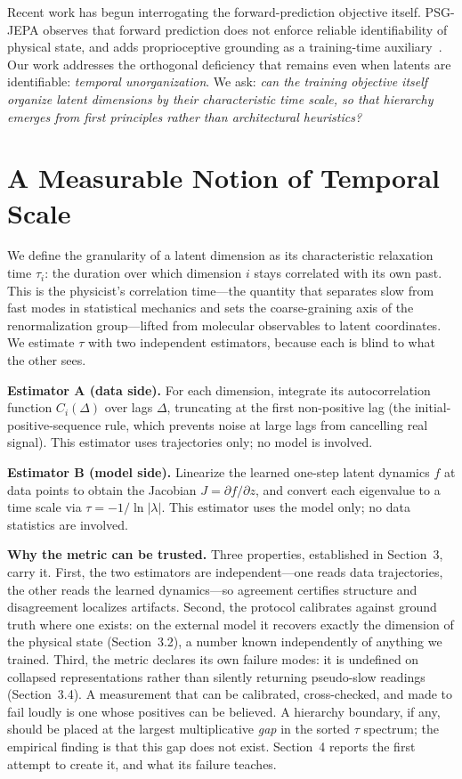 \documentclass[11pt]{article}
\begin{document}
Recent work has begun interrogating the forward-prediction objective itself. PSG-JEPA observes that forward prediction does not enforce reliable identifiability of physical state, and adds proprioceptive grounding as a training-time auxiliary~\cite{psgjepa2026}. Our work addresses the orthogonal deficiency that remains even when latents are identifiable: \emph{temporal unorganization}. We ask: \emph{can the training objective itself organize latent dimensions by their characteristic time scale, so that hierarchy emerges from first principles rather than architectural heuristics?}

\section{A Measurable Notion of Temporal Scale}

We define the granularity of a latent dimension as its characteristic relaxation time $\tau_i$: the duration over which dimension $i$ stays correlated with its own past. This is the physicist's correlation time---the quantity that separates slow from fast modes in statistical mechanics and sets the coarse-graining axis of the renormalization group---lifted from molecular observables to latent coordinates. We estimate $\tau$ with two independent estimators, because each is blind to what the other sees.

\textbf{Estimator A (data side).} For each dimension, integrate its autocorrelation function $C_i(\Delta)$ over lags $\Delta$, truncating at the first non-positive lag (the initial-positive-sequence rule, which prevents noise at large lags from cancelling real signal). This estimator uses trajectories only; no model is involved.

\textbf{Estimator B (model side).} Linearize the learned one-step latent dynamics $f$ at data points to obtain the Jacobian $J = \partial f / \partial z$, and convert each eigenvalue to a time scale via $\tau = -1/\ln|\lambda|$. This estimator uses the model only; no data statistics are involved.

\textbf{Why the metric can be trusted.} Three properties, established in Section~3, carry it. First, the two estimators are independent---one reads data trajectories, the other reads the learned dynamics---so agreement certifies structure and disagreement localizes artifacts. Second, the protocol calibrates against ground truth where one exists: on the external model it recovers exactly the dimension of the physical state (Section~3.2), a number known independently of anything we trained. Third, the metric declares its own failure modes: it is undefined on collapsed representations rather than silently returning pseudo-slow readings (Section~3.4). A measurement that can be calibrated, cross-checked, and made to fail loudly is one whose positives can be believed. A hierarchy boundary, if any, should be placed at the largest multiplicative \emph{gap} in the sorted $\tau$ spectrum; the empirical finding is that this gap does not exist. Section~4 reports the first attempt to create it, and what its failure teaches.
\end{document}
